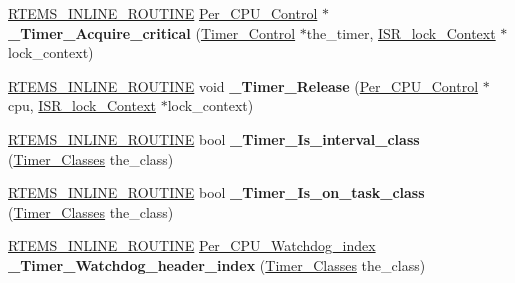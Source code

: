 \begin{DoxyCompactItemize}
\item 
\mbox{\label{group__ClassicTimerImpl_ga2481e0d8ec0197f69ef648b23d742b80}} 
\mbox{\hyperlink{group__RTEMSScoreBaseDefs_gac216239df231d5dbd15e3520b0b9313f}{R\+T\+E\+M\+S\+\_\+\+I\+N\+L\+I\+N\+E\+\_\+\+R\+O\+U\+T\+I\+NE}} \mbox{\hyperlink{structPer__CPU__Control}{Per\+\_\+\+C\+P\+U\+\_\+\+Control}} $\ast$ {\bfseries \+\_\+\+Timer\+\_\+\+Acquire\+\_\+critical} (\mbox{\hyperlink{structTimer__Control}{Timer\+\_\+\+Control}} $\ast$the\+\_\+timer, \mbox{\hyperlink{structISR__lock__Context}{I\+S\+R\+\_\+lock\+\_\+\+Context}} $\ast$lock\+\_\+context)
\item 
\mbox{\label{group__ClassicTimerImpl_ga9ea668bbebc7986833bffff61fb751c2}} 
\mbox{\hyperlink{group__RTEMSScoreBaseDefs_gac216239df231d5dbd15e3520b0b9313f}{R\+T\+E\+M\+S\+\_\+\+I\+N\+L\+I\+N\+E\+\_\+\+R\+O\+U\+T\+I\+NE}} void {\bfseries \+\_\+\+Timer\+\_\+\+Release} (\mbox{\hyperlink{structPer__CPU__Control}{Per\+\_\+\+C\+P\+U\+\_\+\+Control}} $\ast$cpu, \mbox{\hyperlink{structISR__lock__Context}{I\+S\+R\+\_\+lock\+\_\+\+Context}} $\ast$lock\+\_\+context)
\item 
\mbox{\label{group__ClassicTimerImpl_ga5bf66c427ea82cc77a9f7bd2c35799b3}} 
\mbox{\hyperlink{group__RTEMSScoreBaseDefs_gac216239df231d5dbd15e3520b0b9313f}{R\+T\+E\+M\+S\+\_\+\+I\+N\+L\+I\+N\+E\+\_\+\+R\+O\+U\+T\+I\+NE}} bool {\bfseries \+\_\+\+Timer\+\_\+\+Is\+\_\+interval\+\_\+class} (\mbox{\hyperlink{group__ClassicTimer_gaca88ac1e833f63ec72d38e07677f2f27}{Timer\+\_\+\+Classes}} the\+\_\+class)
\item 
\mbox{\label{group__ClassicTimerImpl_gaf2616957bbd4c72158bc785bf2bd6b23}} 
\mbox{\hyperlink{group__RTEMSScoreBaseDefs_gac216239df231d5dbd15e3520b0b9313f}{R\+T\+E\+M\+S\+\_\+\+I\+N\+L\+I\+N\+E\+\_\+\+R\+O\+U\+T\+I\+NE}} bool {\bfseries \+\_\+\+Timer\+\_\+\+Is\+\_\+on\+\_\+task\+\_\+class} (\mbox{\hyperlink{group__ClassicTimer_gaca88ac1e833f63ec72d38e07677f2f27}{Timer\+\_\+\+Classes}} the\+\_\+class)
\item 
\mbox{\label{group__ClassicTimerImpl_ga87bad837f2067c99fb19c6a7f05164c0}} 
\mbox{\hyperlink{group__RTEMSScoreBaseDefs_gac216239df231d5dbd15e3520b0b9313f}{R\+T\+E\+M\+S\+\_\+\+I\+N\+L\+I\+N\+E\+\_\+\+R\+O\+U\+T\+I\+NE}} \mbox{\hyperlink{group__PerCPU_ga43ab5440a69211901b58fa787f9cd76e}{Per\+\_\+\+C\+P\+U\+\_\+\+Watchdog\+\_\+index}} {\bfseries \+\_\+\+Timer\+\_\+\+Watchdog\+\_\+header\+\_\+index} (\mbox{\hyperlink{group__ClassicTimer_gaca88ac1e833f63ec72d38e07677f2f27}{Timer\+\_\+\+Classes}} the\+\_\+class)

\end{DoxyCompactItemize}
